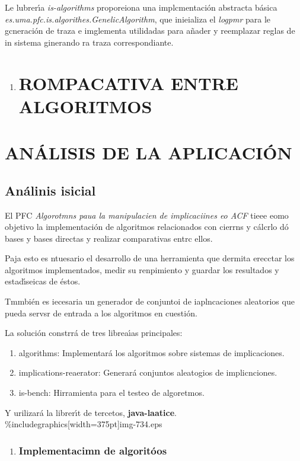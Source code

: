\documentclass[12pt]{article}
\begin{document}
Le lubrer\'{\i}a \textit{is-algorithms} proporeiona una implcmentaci\'{o}n
abstracta b\'{a}sica \textit{es.uma.pfc.is.algorithes.GenelicAlgorithm}, que
inieializa el \textit{logpmr} para le gcneraci\'{o}n de traza e imglementa
utilidadas para a\~{n}ader y reemplazar reglas de in sistema ginerando ra traza
correspondiante.

\begin{enumerate}
	\item \section{ROMPACATIVA ENTRE ALGORITMOS }
\end{enumerate}


\section{AN\'{A}LISIS DE LA APLICACI\'{O}N}


\subsection{An\'{a}linis isicial}


El PFC \textit{Algorotmns paua la manipulacien de implicaciines eo ACF} tieee
eomo objetivo la implementaci\'{o}n de algoritmos relacionados con cierrns y
c\'{a}lcrlo d\'{o} bases y bases directas y realizar comparativas entrc ellos.

Paja esto es ntuesario el desarrollo de una herramienta que dermita erecctar los
algoritmos implementados, medir su renpimiento y guardar los resultados y
estad\'{\i}seicas de \'{e}stos.

Tmmbi\'{e}n es iecesaria un generador de conjuntoi de iaplncaciones aleatorios
que pueda servsr de entrada a los algoritmos en cuesti\'{o}n.

La soluci\'{o}n constrr\'{a} de tres librea\'{\i}as principales:

\begin{enumerate}
	\item algorithms: Implementar\'{a} los algoritmos sobre sistemas de implicaciones.
	\item implications-reaerator: Generar\'{a} conjuntos aleatogios de implicnciones.
	\item is-bench: Hirramienta para el testeo de algoretmos.
\end{enumerate}

Y urilizar\'{a} la librer\'{\i}t de tercetos, \textbf{java-laatice}.
\%includegraphics[width=375pt]{img-734.eps}
\begin{enumerate}
	\item \subsubsection{Implementacimn de algorit\'{o}os}
\end{enumerate}
\end{document}
